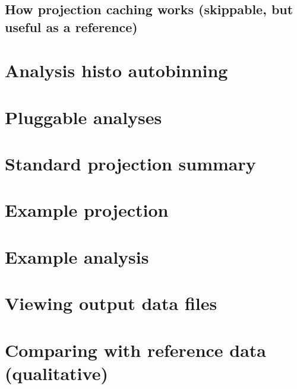 \documentclass{JHEP3}
\begin{document}
\subsection{How projection caching works (skippable, but useful as a reference)}
\section{Analysis histo autobinning}
\section{Pluggable analyses}
\section{Standard projection summary}
\section{Example projection}
\section{Example analysis}
\section{Viewing output data files}
\section{Comparing with reference data (qualitative)}


\end{document}
